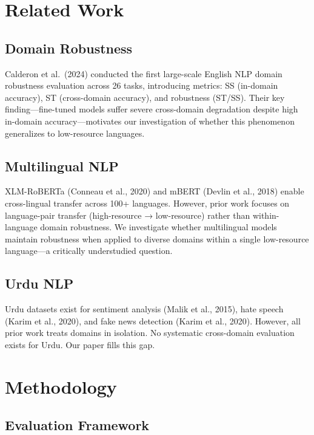 \documentclass[10pt,twocolumn,journal]{IEEEtran}
\begin{document}
\section{Related Work}

\subsection{Domain Robustness}

Calderon et al.\ (2024) conducted the first large-scale English NLP domain robustness evaluation across 26 tasks, introducing metrics: SS (in-domain accuracy), ST (cross-domain accuracy), and robustness (ST/SS). Their key finding---fine-tuned models suffer severe cross-domain degradation despite high in-domain accuracy---motivates our investigation of whether this phenomenon generalizes to low-resource languages.

\subsection{Multilingual NLP}

XLM-RoBERTa (Conneau et al., 2020) and mBERT (Devlin et al., 2018) enable cross-lingual transfer across 100+ languages. However, prior work focuses on language-pair transfer (high-resource → low-resource) rather than within-language domain robustness. We investigate whether multilingual models maintain robustness when applied to diverse domains within a single low-resource language---a critically understudied question.

\subsection{Urdu NLP}

Urdu datasets exist for sentiment analysis (Malik et al., 2015), hate speech (Karim et al., 2020), and fake news detection (Karim et al., 2020). However, all prior work treats domains in isolation. No systematic cross-domain evaluation exists for Urdu. Our paper fills this gap.

\section{Methodology}

\subsection{Evaluation Framework}
\end{document}
